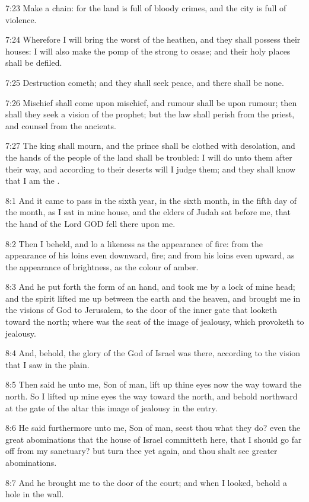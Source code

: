 7:23 Make a chain: for the land is full of bloody crimes, and the city is full of violence.

7:24 Wherefore I will bring the worst of the heathen, and they shall possess their houses: I will also make the pomp of the strong to cease; and their holy places shall be defiled.

7:25 Destruction cometh; and they shall seek peace, and there shall be none.

7:26 Mischief shall come upon mischief, and rumour shall be upon rumour; then shall they seek a vision of the prophet; but the law shall perish from the priest, and counsel from the ancients.

7:27 The king shall mourn, and the prince shall be clothed with desolation, and the hands of the people of the land shall be troubled: I will do unto them after their way, and according to their deserts will I judge them; and they shall know that I am the \LORD.

8:1 And it came to pass in the sixth year, in the sixth month, in the fifth day of the month, as I sat in mine house, and the elders of Judah sat before me, that the hand of the Lord GOD fell there upon me.

8:2 Then I beheld, and lo a likeness as the appearance of fire: from the appearance of his loins even downward, fire; and from his loins even upward, as the appearance of brightness, as the colour of amber.

8:3 And he put forth the form of an hand, and took me by a lock of mine head; and the spirit lifted me up between the earth and the heaven, and brought me in the visions of God to Jerusalem, to the door of the inner gate that looketh toward the north; where was the seat of the image of jealousy, which provoketh to jealousy.

8:4 And, behold, the glory of the God of Israel was there, according to the vision that I saw in the plain.

8:5 Then said he unto me, Son of man, lift up thine eyes now the way toward the north. So I lifted up mine eyes the way toward the north, and behold northward at the gate of the altar this image of jealousy in the entry.

8:6 He said furthermore unto me, Son of man, seest thou what they do?  even the great abominations that the house of Israel committeth here, that I should go far off from my sanctuary? but turn thee yet again, and thou shalt see greater abominations.

8:7 And he brought me to the door of the court; and when I looked, behold a hole in the wall.

